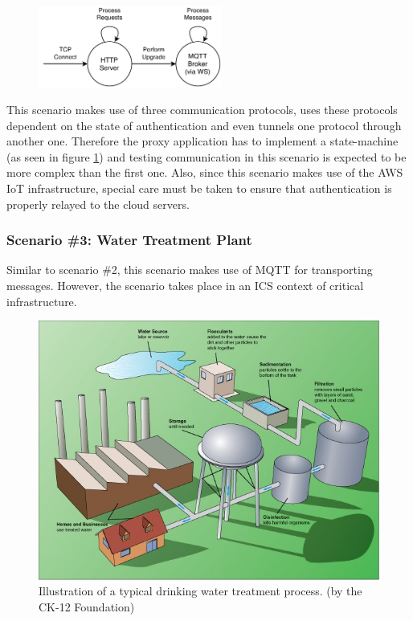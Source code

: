 \begin{figure}[h]
    \centering
    \includegraphics[width=6cm]{img/ch04/Statemachine 2.pdf}
    \label{fig:aws-statemachine}
\end{figure}
This scenario makes use of three communication protocols, uses these protocols dependent on the state of authentication and even tunnels one protocol through another one. Therefore the proxy application has to implement a state-machine (as seen in figure \ref{fig:aws-statemachine}) and testing communication in this scenario is expected to be more complex than the first one. Also, since this scenario makes use of the \ac{AWS} \ac{IoT} infrastructure, special care must be taken to ensure that authentication is properly relayed to the cloud servers.


\subsubsection{Scenario \#3: Water Treatment Plant}
\label{par:scenario-3}Similar to scenario \#2, this scenario makes use of \ac{MQTT} for transporting messages. However, the scenario takes place in an \ac{ICS} context of critical infrastructure.

\begin{figure}[h!]
    \centering
    \includegraphics[width=12cm]{img/ch04/watertreatmentplant.png}
    \caption[Illustration of a typical drinking water treatment process. (by the CK-12 Foundation)]{Illustration of a typical drinking water treatment process. (by the CK-12 Foundation)\protect\footnotemark}
    \label{fig:water-treatment}
\end{figure}


